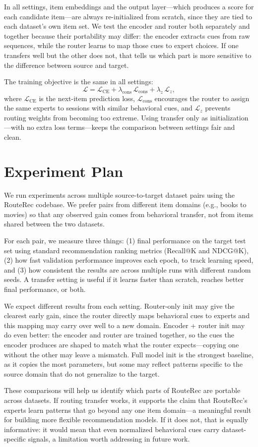 \documentclass{article}
\begin{document}
In all settings, item embeddings and the output layer---which produces a score for each candidate item---are always re-initialized from scratch, since they are tied to each dataset's own item set. We test the encoder and router both separately and together because their portability may differ: the encoder extracts cues from raw sequences, while the router learns to map those cues to expert choices. If one transfers well but the other does not, that tells us which part is more sensitive to the difference between source and target.

The training objective is the same in all settings:
\[
\mathcal{L} = \mathcal{L}_{\mathrm{CE}} + \lambda_{\mathrm{cons}}\,\mathcal{L}_{\mathrm{cons}} + \lambda_z\,\mathcal{L}_z,
\]
where $\mathcal{L}_{\mathrm{CE}}$ is the next-item prediction loss, $\mathcal{L}_{\mathrm{cons}}$ encourages the router to assign the same experts to sessions with similar behavioral cues, and $\mathcal{L}_z$ prevents routing weights from becoming too extreme. Using transfer only as initialization---with no extra loss terms---keeps the comparison between settings fair and clean.

\section{Experiment Plan}
We run experiments across multiple source-to-target dataset pairs using the RouteRec codebase. We prefer pairs from different item domains (e.g., books to movies) so that any observed gain comes from behavioral transfer, not from items shared between the two datasets.

For each pair, we measure three things: (1) final performance on the target test set using standard recommendation ranking metrics (Recall@K and NDCG@K), (2) how fast validation performance improves each epoch, to track learning speed, and (3) how consistent the results are across multiple runs with different random seeds. A transfer setting is useful if it learns faster than scratch, reaches better final performance, or both.

We expect different results from each setting. Router-only init may give the clearest early gain, since the router directly maps behavioral cues to experts and this mapping may carry over well to a new domain. Encoder + router init may do even better: the encoder and router are trained together, so the cues the encoder produces are shaped to match what the router expects---copying one without the other may leave a mismatch. Full model init is the strongest baseline, as it copies the most parameters, but some may reflect patterns specific to the source domain that do not generalize to the target.

These comparisons will help us identify which parts of RouteRec are portable across datasets. If routing transfer works, it supports the claim that RouteRec's experts learn patterns that go beyond any one item domain---a meaningful result for building more flexible recommendation models. If it does not, that is equally informative: it would mean that even normalized behavioral cues carry dataset-specific signals, a limitation worth addressing in future work.
\end{document}
